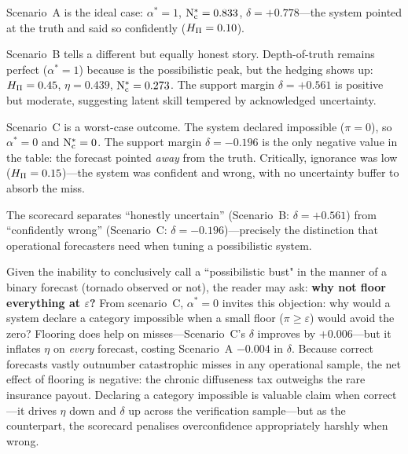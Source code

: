 Scenario~A is the ideal case: $\alpha^* = 1$, $\mathrm{N}_{\mathrm{c}}^* = 0.833$,
$\delta = +0.778$---the system pointed at the truth and said so
confidently ($H_{\Pi} = 0.10$).

Scenario~B tells a different but equally honest story. Depth-of-truth
remains perfect ($\alpha^* = 1$) because  is the possibilistic
peak, but the hedging shows up: $H_{\Pi} = 0.45$, $\eta = 0.439$,
$\mathrm{N}_{\mathrm{c}}^* = 0.273$. The support margin $\delta = +0.561$ is positive
but moderate, suggesting latent skill tempered by acknowledged uncertainty.

Scenario~C is a worst-case outcome. The system declared  impossible
($\pi = 0$), so $\alpha^* = 0$ and $\mathrm{N}_{\mathrm{c}}^* = 0$. The support margin
$\delta = -0.196$ is the only negative value in the table: the forecast
pointed \emph{away} from the truth. Critically, ignorance was low
($H_{\Pi} = 0.15$)---the system was confident and wrong, with no
uncertainty buffer to absorb the miss.

The scorecard separates ``honestly uncertain'' (Scenario~B:
$\delta = +0.561$) from ``confidently wrong'' (Scenario~C:
$\delta = -0.196$)---precisely the distinction that operational
forecasters need when tuning a possibilistic system.

Given the inability to conclusively call a
``possibilistic bust" in the manner of a binary
forecast (tornado observed or not),
the reader may ask:
\textbf{why not floor everything at $\varepsilon$?}
From scenario~C, $\alpha^* = 0$ invites this objection: why would a
system declare a category impossible when a small floor
($\pi \geq \varepsilon$) would avoid the zero? Flooring does help on
misses---Scenario~C's $\delta$ improves by $+0.006$---but it inflates
$\eta$ on \textit{every} forecast, costing Scenario~A $-0.004$ in
$\delta$. Because correct forecasts vastly outnumber catastrophic
misses in any operational sample, the net effect of flooring is
negative: the chronic diffuseness tax outweighs the rare insurance
payout. Declaring a category impossible is valuable claim
when correct---it drives $\eta$ down and $\delta$ up across the
verification sample---but as the counterpart,
the scorecard penalises overconfidence
appropriately harshly when wrong.

